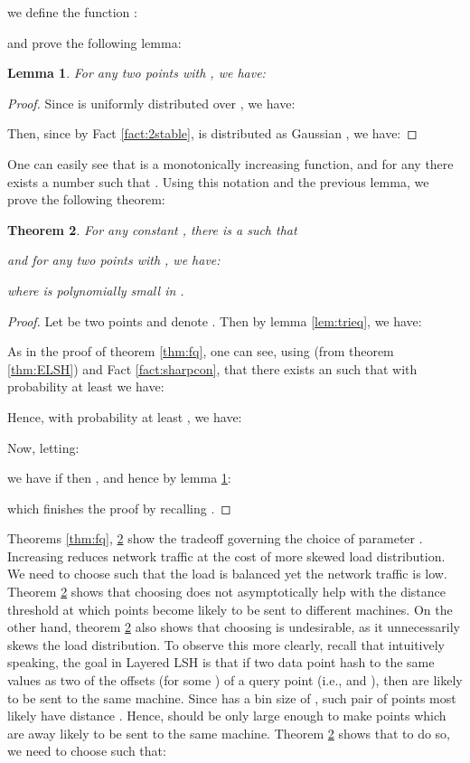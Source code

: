 \documentclass{acm_proc_article-sp}
\numberwithin{equation}{section}
\numberwithin{figure}{section}
\newtheorem{thm}{Theorem}
\newtheorem{lemma}[thm]{Lemma}
\begin{document}
we define the function :

and prove the following lemma:
\begin{lemma} For any two points  with , we have:
\label{lem:GueqGv}

\end{lemma}
\begin{proof} Since  is uniformly distributed over , we have:

Then, since by Fact \ref{fact:2stable},  is distributed as Gaussian , we have:

\end{proof}

One can easily see that  is a monotonically increasing function, and for any  there exists a number  such that . Using this notation and the previous lemma, we prove the following theorem:

\begin{thm}
\label{thm:rc} For any constant , there is a  such that

and for any two points  with , we have:

where  is polynomially small in .
\end{thm}
\begin{proof}
Let  be two points and denote . Then by lemma \ref{lem:trieq}, we have:

As in the proof of theorem \ref{thm:fq}, one can see, using  (from theorem \ref{thm:ELSH}) and Fact \ref{fact:sharpcon}, that there exists an  such that with probability at least  we have:

Hence, with probability at least , we have:

Now, letting:

we have if  then , and hence by lemma \ref{lem:GueqGv}:

which finishes the proof by recalling .
\end{proof}

Theorems \ref{thm:fq}, \ref{thm:rc} show the tradeoff governing the choice of parameter . Increasing  reduces network traffic at the cost of more skewed load distribution. We need to choose  such that the load is balanced yet the network traffic is low. Theorem \ref{thm:rc} shows that choosing  does not asymptotically help with the distance threshold at which points become likely to be sent to different machines. On the other hand, theorem \ref{thm:rc} also shows that choosing  is undesirable, as it unnecessarily skews the load distribution. To observe this more clearly, recall that intuitively speaking, the goal in Layered LSH is that if two data point  hash to the same values as two of the offsets  (for some ) of a query point  (i.e.,  and ), then  are likely to be sent to the same machine. Since  has a bin size of , such pair of points  most likely have distance . Hence,  should be only large enough to make points which are  away likely to be sent to the same machine. Theorem \ref{thm:rc} shows that to do so, we need to choose  such that:
\end{document}
